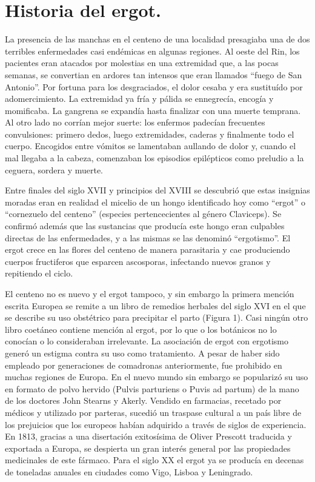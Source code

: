 \section{Historia del ergot.}

La presencia de las manchas en el centeno de una localidad presagiaba una de dos terribles enfermedades casi endémicas en algunas regiones. Al oeste del Rin, los pacientes eran atacados por molestias en una extremidad que, a las pocas semanas, se convertian en ardores tan intensos que eran llamados \enquote{fuego de San Antonio}. Por fortuna para los desgraciados, el dolor cesaba y era sustituído por adomercimiento. La extremidad ya fría y pálida se ennegrecía, encogía y momificaba. La gangrena se expandía hasta finalizar con una muerte temprana. Al otro lado no corrían mejor suerte: los enfermos padecían frecuentes convulsiones: primero dedos, luego extremidades, caderas y finalmente todo el cuerpo. Encogidos entre vómitos se lamentaban aullando de dolor y, cuando el mal llegaba a la cabeza, comenzaban los episodios epilépticos como preludio a la ceguera, sordera y muerte.

Entre finales del siglo XVII y principios del XVIII se descubrió que estas insignias moradas eran en realidad el micelio de un hongo identificado hoy como \enquote{ergot} o \enquote{cornezuelo del centeno} (especies pertencecientes al género Claviceps). Se confirmó además que las sustancias que producía este hongo eran culpables directas de las enfermedades, y a las mismas se las denominó \enquote{ergotismo}. El ergot crece en las flores del centeno de manera parasitaria y cae produciendo cuerpos fructiferos que esparcen ascosporas, infectando nuevos granos y repitiendo el ciclo.

El centeno no es nuevo y el ergot tampoco, y sin embargo la primera mención escrita Europea se remite a un libro de remedios herbales del siglo XVI en el que se describe su uso obstétrico para precipitar el parto (Figura 1). Casi ningún otro libro coetáneo contiene mención al ergot, por lo que o los botánicos no lo conocían o lo consideraban irrelevante. La asociación de ergot con ergotismo generó un estigma contra su uso como tratamiento. A pesar de haber sido empleado por generaciones de comadronas anteriormente, fue prohibido en muchas regiones de Europa. En el nuevo mundo sin embargo se popularizó su uso en formato de polvo hervido (Pulvis parturiens o Puvis ad partum) de la mano de los doctores John Stearns y Akerly. Vendido en farmacias, recetado por médicos y utilizado por parteras, sucedió un traspase cultural a un país libre de los prejuicios que los europeos habían adquirido a través de siglos de experiencia. En 1813, gracias a una disertación exitosísima de Oliver Prescott traducida y exportada a Europa, se despierta un gran interés general por las propiedades medicinales de este fármaco. Para el siglo XX el ergot ya se producía en decenas de toneladas anuales en ciudades como Vigo, Lisboa y Leningrado. 

